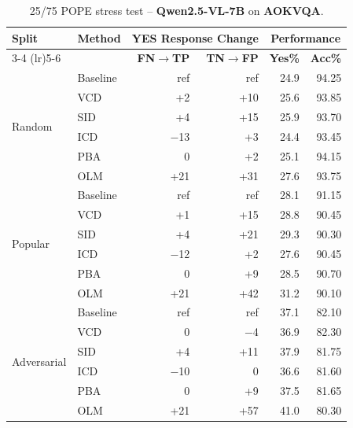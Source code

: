 \documentclass[11pt]{article}
\begin{document}
\begin{table}[ht]
\centering
\caption{25/75 POPE stress test -- \textbf{Qwen2.5-VL-7B} on \textbf{AOKVQA}.}
\label{tab:25_75_qwen_aokvqa}
\setlength{\tabcolsep}{6pt}
\renewcommand{\arraystretch}{1.1}
\begin{tabular}{l|l|rr|rr}
\toprule
\multirow{2}{*}{\textbf{Split}} &
\multirow{2}{*}{\textbf{Method}} &
\multicolumn{2}{c|}{\textbf{YES Response Change}} &
\multicolumn{2}{c}{\textbf{Performance}} \\
\cmidrule(lr){3-4} \cmidrule(lr){5-6}
& & \textbf{FN$\to$TP} & \textbf{TN$\to$FP} & \textbf{Yes\%} & \textbf{Acc\%} \\
\midrule

\multirow{6}{*}{Random}
& Baseline & ref   & ref  & 24.9 & 94.25 \\
& VCD      & +2    & +10  & 25.6 & 93.85 \\
& SID      & +4    & +15  & 25.9 & 93.70 \\
& ICD      & $-$13 & +3   & 24.4 & 93.45 \\
& PBA      & 0     & +2   & 25.1 & 94.15 \\
& OLM      & +21   & +31  & 27.6 & 93.75 \\
\midrule

\multirow{6}{*}{Popular}
& Baseline & ref   & ref  & 28.1 & 91.15 \\
& VCD      & +1    & +15  & 28.8 & 90.45 \\
& SID      & +4    & +21  & 29.3 & 90.30 \\
& ICD      & $-$12 & +2   & 27.6 & 90.45 \\
& PBA      & 0     & +9   & 28.5 & 90.70 \\
& OLM      & +21   & +42  & 31.2 & 90.10 \\
\midrule

\multirow{6}{*}{Adversarial}
& Baseline & ref   & ref  & 37.1 & 82.10 \\
& VCD      & 0     & $-$4 & 36.9 & 82.30 \\
& SID      & +4    & +11  & 37.9 & 81.75 \\
& ICD      & $-$10 & 0    & 36.6 & 81.60 \\
& PBA      & 0     & +9   & 37.5 & 81.65 \\
& OLM      & +21   & +57  & 41.0 & 80.30 \\
\bottomrule
\end{tabular}
\end{table}
\end{document}
